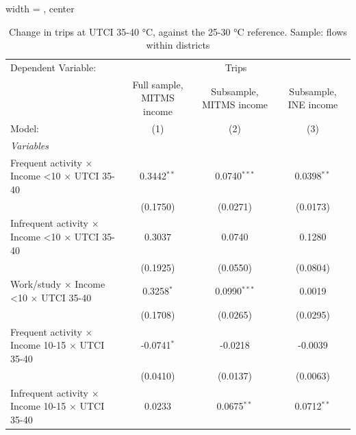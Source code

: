 
\begin{table}[htbp]
   \caption{\label{table_models_abc_35-40} Change in trips at UTCI 35-40 °C, against the 25-30 °C reference. Sample: flows within districts}
   \centering
   \small
   \begin{adjustbox}{width = \textwidth, center}
      \begin{tabular}{lccc}
         \tabularnewline \midrule \midrule
         Dependent Variable: & \multicolumn{3}{c}{Trips}\\
                                                                         & Full sample, MITMS income & Subsample, MITMS income & Subsample, INE income \\   
         Model:                                                          & (1)                       & (2)                     & (3)\\  
         \midrule
         \emph{Variables}\\
         Frequent activity $\times$ Income <10 $\times$ UTCI 35-40       & 0.3442$^{**}$             & 0.0740$^{***}$          & 0.0398$^{**}$\\   
                                                                         & (0.1750)                  & (0.0271)                & (0.0173)\\   
         Infrequent activity $\times$ Income <10 $\times$ UTCI 35-40     & 0.3037                    & 0.0740                  & 0.1280\\   
                                                                         & (0.1925)                  & (0.0550)                & (0.0804)\\   
         Work/study $\times$ Income <10 $\times$ UTCI 35-40              & 0.3258$^{*}$              & 0.0990$^{***}$          & 0.0019\\   
                                                                         & (0.1708)                  & (0.0265)                & (0.0295)\\   
         Frequent activity $\times$ Income 10-15 $\times$ UTCI 35-40     & -0.0741$^{*}$             & -0.0218                 & -0.0039\\   
                                                                         & (0.0410)                  & (0.0137)                & (0.0063)\\   
         Infrequent activity $\times$ Income 10-15 $\times$ UTCI 35-40   & 0.0233                    & 0.0675$^{**}$           & 0.0712$^{**}$\\   

\end{tabular}
\end{adjustbox}
\end{table}
